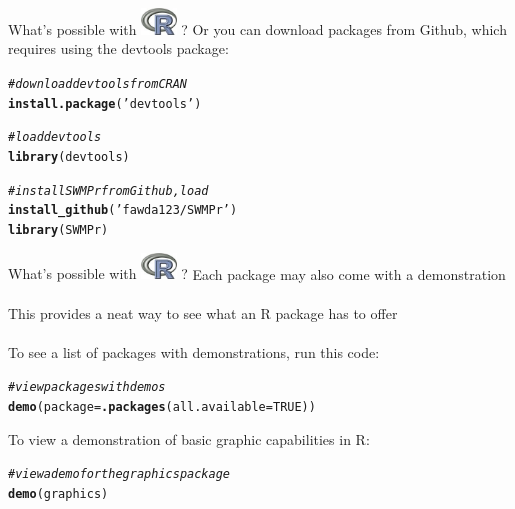 \documentclass[xcolor=svgnames]{beamer}\usepackage[]{graphicx}\usepackage[]{color}
\makeatletter
\newcommand{\hlnum}[1]{\textcolor[rgb]{0.686,0.059,0.569}{#1}}%
\newcommand{\hlstr}[1]{\textcolor[rgb]{0.192,0.494,0.8}{#1}}%
\newcommand{\hlcom}[1]{\textcolor[rgb]{0.678,0.584,0.686}{\textit{#1}}}%
\newcommand{\hlstd}[1]{\textcolor[rgb]{0.345,0.345,0.345}{#1}}%
\newcommand{\hlkwc}[1]{\textcolor[rgb]{0.333,0.667,0.333}{#1}}%
\newcommand{\hlkwd}[1]{\textcolor[rgb]{0.737,0.353,0.396}{\textbf{#1}}}%
\newenvironment{kframe}{%
 \def\at@end@of@kframe{}%
 \ifinner\ifhmode%
  \def\at@end@of@kframe{\end{minipage}}%
  \begin{minipage}{\columnwidth}%
 \fi\fi%
 \def\FrameCommand##1{\hskip\@totalleftmargin \hskip-\fboxsep
 \colorbox{shadecolor}{##1}\hskip-\fboxsep
     \hskip-\linewidth \hskip-\@totalleftmargin \hskip\columnwidth}%
 \MakeFramed {\advance\hsize-\width
   \@totalleftmargin\z@ \linewidth\hsize
   \@setminipage}}%
 {\par\unskip\endMakeFramed%
 \at@end@of@kframe}
\newenvironment{knitrout}{}{} %
\makeatother
\begin{document}
\begin{frame}[t,fragile]{What's possible with \includegraphics[width=0.07\textwidth]{Rlogo.jpg} \hspace{0.2em}? }
Or you can download packages from Github, which requires using the devtools package:
\begin{knitrout}\scriptsize
{}\color{fgcolor}\begin{kframe}
\begin{alltt}
\hlcom{# download devtools from CRAN}
\hlkwd{install.package}\hlstd{(}\hlstr{'devtools'}\hlstd{)}

\hlcom{# load devtools}
\hlkwd{library}\hlstd{(devtools)}

\hlcom{# install SWMPr from Github, load}
\hlkwd{install_github}\hlstd{(}\hlstr{'fawda123/SWMPr'}\hlstd{)}
\hlkwd{library}\hlstd{(SWMPr)}
\end{alltt}
\end{kframe}
\end{knitrout}
\end{frame}

\begin{frame}[t,fragile]{What's possible with \includegraphics[width=0.07\textwidth]{Rlogo.jpg} \hspace{0.2em}? }
Each package may also come with a demonstration\\~\\
This provides a neat way to see what an R package has to offer\\~\\
To see a list of packages with demonstrations, run this code:
\begin{knitrout}\scriptsize
{}\color{fgcolor}\begin{kframe}
\begin{alltt}
\hlcom{# view packages with demos}
\hlkwd{demo}\hlstd{(}\hlkwc{package} \hlstd{=} \hlkwd{.packages}\hlstd{(}\hlkwc{all.available} \hlstd{=} \hlnum{TRUE}\hlstd{))}
\end{alltt}
\end{kframe}
\end{knitrout}
To view a demonstration of basic graphic capabilities in R:
\begin{knitrout}\scriptsize
{}\color{fgcolor}\begin{kframe}
\begin{alltt}
\hlcom{# view a demo for the graphics package}
\hlkwd{demo}\hlstd{(graphics)}
\end{alltt}
\end{kframe}
\end{knitrout}
\end{frame}
\end{document}
